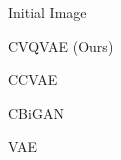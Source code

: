 \begin{figure}[t]
    \begin{subfigure}[b]{0.14\textwidth}
        \begin{flushright}
        
        Initial Image
        
        \vspace{0.35cm}
        
        CVQVAE (Ours)
        
        \vspace{0.35cm}
        
        CCVAE
        
        \vspace{0.35cm}
        
        CBiGAN
        
        \vspace{0.35cm}
        
        VAE
        
        \vspace{0.22cm}
        
        \end{flushright}
        
    \end{subfigure}
    \begin{subfigure}[b]{0.3\textwidth}
        \center
        

\end{subfigure}
\end{figure}
